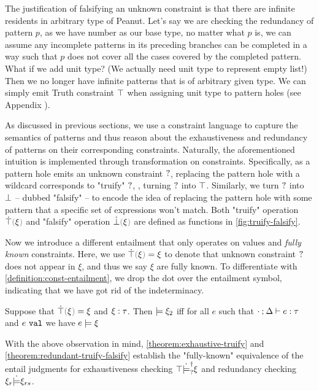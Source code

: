 The justification of falsifying an unknown constraint is that there are infinite residents in arbitrary type of Peanut. Let's say we are checking the redundancy of pattern $p$, as we have number as our base type, no matter what $p$ is, we can assume any incomplete patterns in its preceding branches can be completed in a way such that $p$ does not cover all the cases covered by the completed pattern.
What if we add unit type? (We actually need unit type to represent empty list!) Then we no longer have infinite patterns that is of arbitrary given type. We can simply emit Truth constraint $\top$ when assigning unit type to pattern holes (see Appendix \todo{}).

As discussed in previous sections, we use a constraint language to capture the semantics of patterns and thus reason about the exhaustiveness and redundancy of patterns on their corresponding constraints. Naturally, the aforementioned intuition is implemented through transformation on constraints. Specifically, as a pattern hole emits an unknown constraint $\mathtt{?}$, replacing the pattern hole with a wildcard corresponds to "truify" $\mathtt{?}$, \ie, turning $\mathtt{?}$ into $\top$. Similarly, we turn $\mathtt{?}$ into $\bot$ -- dubbed "falsify" -- to encode the idea of replacing the pattern hole with some pattern that a specific set of expressions won't match. Both "truify" operation $\ctruify{\xi}$ and "falsify" operation $\cfalsify{\xi}$ are defined as functions in \autoref{fig:truify-falsify}. 



Now we introduce a different entailment that only operates on values and \textit{fully known} constraints. 
Here, we use $\ctruify{\xi}=\xi$ to denote that unknown constraint $\mathtt{?}$ does not appear in $\xi$, and thus we say $\xi$ are fully known. 
To differentiate with \autoref{definition:const-entailment}, we drop the dot over the entailment symbol, indicating that we have got rid of the indeterminacy. 

\begin{definition}
  \label{definition:valid-constraint}
  Suppose that $\ctruify{\xi}=\xi$ and $\xi : \tau$.
  Then $\models \xi_2$ iff for all $e$ such that $\cdot \mathbin{;} \Delta \vdash e : \tau$ and $e ~\mathtt{val}$ we have $e \models \xi$
\end{definition}

With the above observation in mind, \autoref{theorem:exhaustive-truify} and \autoref{theorem:redundant-truify-falsify} establish the "fully-known" equivalence of the entail judgments for exhaustiveness checking $\top \dot{\models}_{?}^{\dag} \xi$ and redundancy checking $\xi_r \dot{\models} \xi_{rs}$.

